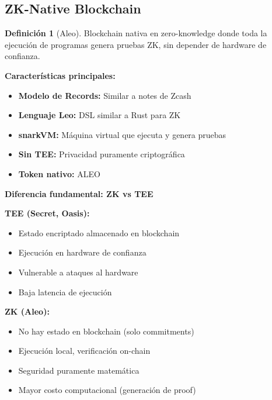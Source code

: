\documentclass[11pt,a4paper,twoside]{book}
\theoremstyle{definition}
\newtheorem{definition}{Definición}[chapter]
\theoremstyle{remark}
\begin{document}
\subsection{ZK-Native Blockchain}

\begin{definition}[Aleo]
Blockchain nativa en zero-knowledge donde toda la ejecución de programas genera pruebas ZK, sin depender de hardware de confianza.

\textbf{Características principales:}
\begin{itemize}
    \item \textbf{Modelo de Records:} Similar a notes de Zcash
    \item \textbf{Lenguaje Leo:} DSL similar a Rust para ZK
    \item \textbf{snarkVM:} Máquina virtual que ejecuta y genera pruebas
    \item \textbf{Sin TEE:} Privacidad puramente criptográfica
    \item \textbf{Token nativo:} ALEO
\end{itemize}
\end{definition}

\begin{keyidea}
\textbf{Diferencia fundamental: ZK vs TEE}

\textbf{TEE (Secret, Oasis):}
\begin{itemize}
    \item Estado encriptado almacenado en blockchain
    \item Ejecución en hardware de confianza
    \item Vulnerable a ataques al hardware
    \item Baja latencia de ejecución
\end{itemize}

\textbf{ZK (Aleo):}
\begin{itemize}
    \item No hay estado en blockchain (solo commitments)
    \item Ejecución local, verificación on-chain
    \item Seguridad puramente matemática
    \item Mayor costo computacional (generación de proof)
\end{itemize}
\end{keyidea}
\end{document}
